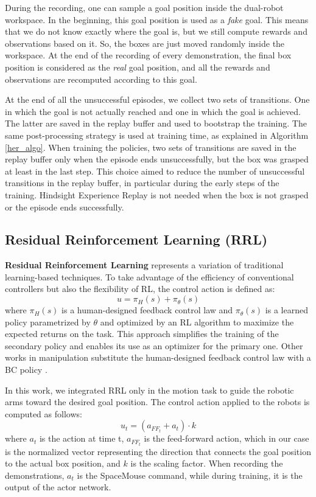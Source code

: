 \documentclass[letterpaper, 10 pt, conference]{ieeeconf}  %
\begin{document}
During the recording, one can sample a goal position inside the dual-robot workspace. In the beginning, this goal position is used as a \textit{fake} goal. This means that we do not know exactly where the goal is, but we still compute rewards and observations based on it. 
So, the boxes are just moved randomly inside the workspace. At the end of the recording of every demonstration, the final box position is considered as the \textit{real} goal position, and all the rewards and observations are recomputed according to this goal.

At the end of all the unsuccessful episodes, we collect two sets of transitions. One in which the goal is not actually reached and one in which the goal is achieved. The latter are saved in the replay buffer and used to bootstrap the training.
The same post-processing strategy is used at training time, as explained in Algorithm \ref{her_algo}. 
When training the policies, two sets of transitions are saved in the replay buffer only when the episode ends unsuccessfully, but the box was grasped at least in the last step.
This choice aimed to reduce the number of unsuccessful transitions in the replay buffer, in particular during the early steps of the training. 
Hindsight Experience Replay is not needed when the box is not grasped or the episode ends successfully.

\subsection{Residual Reinforcement Learning (RRL)}\label{rrl}
\textbf{Residual Reinforcement Learning} \cite{johannink2018residualreinforcementlearningrobot} represents a variation of traditional learning-based techniques. To take advantage of the efficiency of conventional controllers but also the flexibility of RL, the control action is defined as:
\begin{equation}\label{control_rrl}
    u=\pi_H(s) +\pi_\theta(s)
\end{equation}
where $\pi_H(s)$ is a human-designed feedback control law and $\pi_\theta(s)$ is a learned policy parametrized by $\theta$ and optimized by an RL algorithm to maximize the expected returns on the task.
This approach simplifies the training of the secondary policy and enables its use as an optimizer for the primary one. Other works in manipulation substitute the human-designed feedback control law with a BC policy \cite{ankile2024imitationrefinementresidual}.

In this work, we integrated RRL only in the motion task to guide the robotic arms toward the desired goal position. The control action applied to the robots is computed as follows:
\begin{equation}\label{action_Residual}
    u_t=(a_{FF_{t}}+a_{t})\cdot k
\end{equation} %
where $a_t$ is the action at time t, $a_{FF_{t}}$ is the feed-forward action, which in our case is the normalized vector representing the direction that connects the goal position to the actual box position, and $k$ is the scaling factor. 
When recording the demonstrations, $a_t$ is the SpaceMouse command, while during training, it is the output of the actor network.
\end{document}
